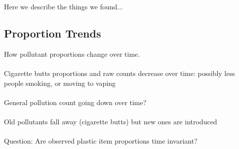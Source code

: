 \documentclass[10pt]{article}\usepackage[]{graphicx}\usepackage[]{color}
\begin{document}
Here we describe the things we found... 

\subsection{Proportion Trends}
How pollutant proportions change over time.\\
\\
Cigarette butts proportions and raw counts decrease over time: possibly less people smoking, or moving to vaping\\
\\
General pollution count going down over time?\\
\\
Old pollutants fall away (cigarette butts) but new ones are introduced\\
\\
Question: Are observed plastic item proportions time invariant?\\
\\
\end{document}
